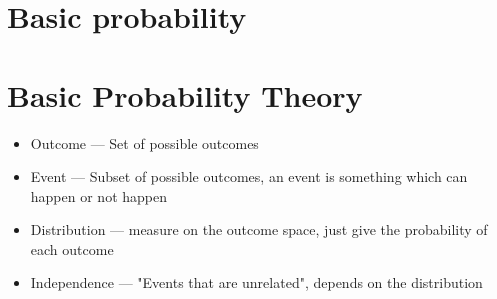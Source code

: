\section{Basic probability}
\section{Basic Probability Theory}
\begin{itemize}
\item Outcome --- Set of possible outcomes
\item Event  --- Subset of possible outcomes, an event is something which can happen or not happen
\item Distribution  ---  measure on the outcome space, just give the probability of each outcome
\item Independence  --- "Events that are unrelated", depends on the distribution
\end{itemize}

